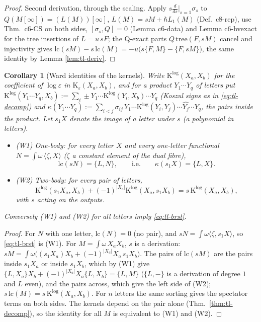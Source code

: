 \documentclass[11pt]{article}
\numberwithin{equation}{section}
\theoremstyle{plain}
\newtheorem{corollary}[theorem]{Corollary}
\theoremstyle{definition}
\begin{document}
\begin{proof}
Second derivation, through the scaling. Apply $s\frac{d}{ds}\big|_{s=1}\sigma_s$ to $Q(M[\infty])=(L(M))[\infty]$, $L(M)=sM+\hbar L_1(M)$ (Def.~c8-rep), use Thm.~c6-CS on both sides, $[\sigma_s,Q]=0$ (Lemma c6-data) and Lemma c6-bvexact for the tree insertions of $L=u\,sF$; the Q-exact parts $Q\,\mathrm{tree}(F,sM)$ cancel and injectivity gives $\mathrm{lc}(sM)-s\,\mathrm{lc}(M)=-u\big(s\{F,M\}-\{F,sM\}\big)$, the same identity by Lemma \ref{lem:tl-deriv}.
\end{proof}

\begin{corollary}[Ward identities of the kernels]
\label{cor:tl-ward}
Write $\mathrm K^{\log}(X_a,X_b)$ for the coefficient of $\log\varepsilon$ in $\mathrm K_\varepsilon(X_a,X_b)$, and for a product $Y_1\cdots Y_q$ of letters put $\mathrm K^{\log}(Y_1\cdots Y_q,X_b):=\sum_i\pm Y_1\cdots\mathrm K^{\log}(Y_i,X_b)\cdots Y_q$ (Koszul signs as in \eqref{eq:tl-decomp}) and $\kappa(Y_1\cdots Y_q):=\sum_{i<j}\sigma_{ij}\,Y_1\cdots\mathrm K^{\log}(Y_i,Y_j)\cdots\widehat{Y_j}\cdots Y_q$, the pairs inside the product. Let $s_1X$ denote the image of a letter under $s$ (a polynomial in letters).
\begin{itemize}
\item (W1) One-body: for every letter $X$ and every one-letter functional $N=\int\omega\,\langle\zeta,X\rangle$ ($\zeta$ a constant element of the dual fibre),
\[
\mathrm{lc}(sN)=\{L,N\},\qquad\text{i.e.}\qquad \kappa(s_1X)=\{L,X\}.
\]
\item (W2) Two-body: for every pair of letters,
\[
\mathrm K^{\log}(s_1X_a,X_b)+(-1)^{|X_a|}\mathrm K^{\log}(X_a,s_1X_b)=s\,\mathrm K^{\log}(X_a,X_b),
\]
with $s$ acting on the outputs.
\end{itemize}
Conversely (W1) and (W2) for all letters imply \eqref{eq:tl-brst}.
\end{corollary}

\begin{proof}
For $N$ with one letter, $\mathrm{lc}(N)=0$ (no pair), and $sN=\int\omega\langle\zeta,s_1X\rangle$, so \eqref{eq:tl-brst} is (W1). For $M=\int\omega\,X_aX_b$, $s$ is a derivation: $sM=\int\omega\big((s_1X_a)X_b+(-1)^{|X_a|}X_a\,s_1X_b\big)$. The pairs of $\mathrm{lc}(sM)$ are the pairs inside $s_1X_a$ or inside $s_1X_b$, which by (W1) give $\{L,X_a\}X_b+(-1)^{|X_a|}X_a\{L,X_b\}=\{L,M\}$ ($\{L,-\}$ is a derivation of degree $1$ and $L$ even), and the pairs across, which give the left side of (W2); $s\,\mathrm{lc}(M)=s\,\mathrm K^{\log}(X_a,X_b)$. For $n$ letters the same sorting gives the spectator terms on both sides. The kernels depend on the pair alone (Thm.~\ref{thm:tl-decomp}), so the identity for all $M$ is equivalent to (W1) and (W2).
\end{proof}
\end{document}
